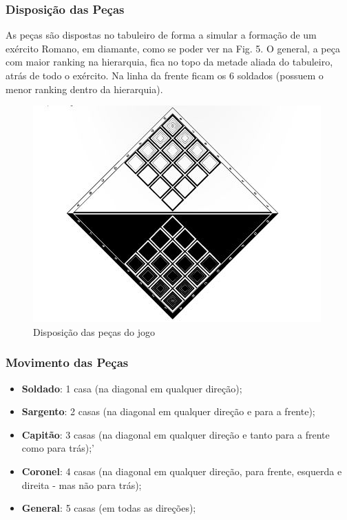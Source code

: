 \subsubsection{Disposição das Peças}
As peças são dispostas no tabuleiro de forma a simular a formação de um exército Romano, em diamante, como se poder ver na Fig. 5.
O general, a peça com maior ranking na hierarquia, fica no topo da metade aliada do tabuleiro, atrás de todo o exército.
Na linha da frente ficam os 6 soldados (possuem o menor ranking dentro da hierarquia).

\begin{figure}[h!]
\begin{center}
\includegraphics[scale=0.5]{img/pieces-disposition.jpg}
\caption{Disposição das peças do jogo}
\label{fig:4}
\end{center}
\end{figure}

\newpage

\subsubsection{Movimento das Peças}

\begin{itemize}
  \item \textbf{Soldado}: 1 casa (na diagonal em qualquer direção);
  \item \textbf{Sargento}: 2 casas (na diagonal em qualquer direção e para a frente);
  \item \textbf{Capitão}: 3 casas (na diagonal em qualquer direção e tanto para a frente como para trás);'
  \item \textbf{Coronel}: 4 casas (na diagonal em qualquer direção, para frente, esquerda e direita - mas não para trás);
  \item \textbf{General}: 5 casas (em todas as direções);
\end{itemize}

